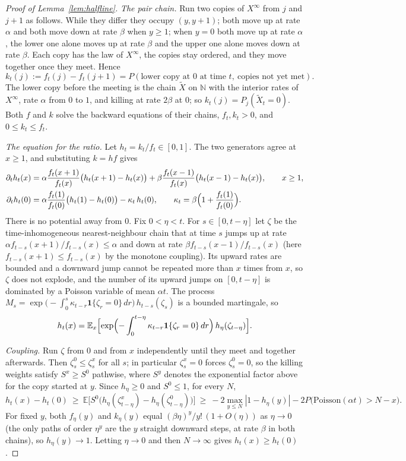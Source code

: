 \documentclass[11pt]{amsart}
\theoremstyle{remark}
\newcommand{\E}{\mathbb{E}}
\newcommand{\N}{\mathbb{N}}
\begin{document}
\begin{proof}[Proof of Lemma~\ref{lem:halfline}]
\emph{The pair chain.} Run two copies of $X^\infty$ from $j$ and $j+1$ as follows. While they differ they occupy
$(y,y+1)$; both move up at rate $\alpha$ and both move down at rate $\beta$ when $y\ge1$; when $y=0$ both move up at rate $\alpha$,
the lower one alone moves up at rate $\beta$ and the upper one alone moves down at rate $\beta$. Each copy has the law of
$X^\infty$, the copies stay ordered, and they move together once they meet. Hence
\[
  k_t(j):=f_t(j)-f_t(j+1)=P(\text{lower copy at }0\text{ at time }t,\ \text{copies not yet met}).
\]
The lower copy before the meeting is the chain $\tilde X$ on $\N$ with the interior rates of $X^\infty$, rate $\alpha$ from $0$ to
$1$, and killing at rate $2\beta$ at $0$; so $k_t(j)=P_j(\tilde X_t=0)$. Both $f$ and $k$ solve the backward equations of their
chains, $f_t,k_t>0$, and $0\le k_t\le f_t$.

\emph{The equation for the ratio.} Let $h_t=k_t/f_t\in[0,1]$. The two generators agree at $x\ge1$, and substituting
$k=hf$ gives
\begin{align*}
  \partial_t h_t(x)&=\alpha\frac{f_t(x+1)}{f_t(x)}\bigl(h_t(x+1)-h_t(x)\bigr)+\beta\frac{f_t(x-1)}{f_t(x)}\bigl(h_t(x-1)-h_t(x)\bigr),
  \qquad x\ge1,\\
  \partial_t h_t(0)&=\alpha\frac{f_t(1)}{f_t(0)}\bigl(h_t(1)-h_t(0)\bigr)-\kappa_t\,h_t(0),\qquad
  \kappa_t=\beta\Bigl(1+\frac{f_t(1)}{f_t(0)}\Bigr).
\end{align*}
There is no potential away from $0$. Fix $0<\eta<t$. For $s\in[0,t-\eta]$ let $\zeta$ be the time-inhomogeneous
nearest-neighbour chain that at time $s$ jumps up at rate $\alpha f_{t-s}(x+1)/f_{t-s}(x)\le\alpha$ and down at rate
$\beta f_{t-s}(x-1)/f_{t-s}(x)$ (here $f_{t-s}(x+1)\le f_{t-s}(x)$ by the monotone coupling). Its upward rates are bounded
and a downward jump cannot be repeated more than $x$ times from $x$, so $\zeta$ does not explode, and the number of its
upward jumps on $[0,t-\eta]$ is dominated by a Poisson variable of mean $\alpha t$. The process
$M_s=\exp\bigl(-\int_0^s\kappa_{t-r}\mathbf{1}\{\zeta_r=0\}\,dr\bigr)\,h_{t-s}(\zeta_s)$ is a bounded martingale, so
\[
  h_t(x)=\E_x\Bigl[\exp\Bigl(-\int_0^{t-\eta}\kappa_{t-r}\mathbf{1}\{\zeta_r=0\}\,dr\Bigr)\,h_\eta(\zeta_{t-\eta})\Bigr].
\]

\emph{Coupling.} Run $\zeta$ from $0$ and from $x$ independently until they meet and together afterwards. Then
$\zeta^0_s\le \zeta^x_s$ for all $s$; in particular $\zeta^x_s=0$ forces $\zeta^0_s=0$, so the killing weights satisfy $S^x\ge S^0$
pathwise, where $S^y$ denotes the exponential factor above for the copy started at $y$. Since $h_\eta\ge0$ and
$S^0\le1$, for every $N$,
\[
  h_t(x)-h_t(0)\ \ge\ \E\bigl[S^0\bigl(h_\eta(\zeta^x_{t-\eta})-h_\eta(\zeta^0_{t-\eta})\bigr)\bigr]
  \ \ge\ -2\max_{y\le N}|1-h_\eta(y)|-2P\bigl(\mathrm{Poisson}(\alpha t)>N-x\bigr).
\]
For fixed $y$, both $f_\eta(y)$ and $k_\eta(y)$ equal $(\beta\eta)^y/y!\,(1+O(\eta))$ as $\eta\to0$ (the only paths of
order $\eta^y$ are the $y$ straight downward steps, at rate $\beta$ in both chains), so $h_\eta(y)\to1$. Letting
$\eta\to0$ and then $N\to\infty$ gives $h_t(x)\ge h_t(0)$.


\end{proof}
\end{document}
